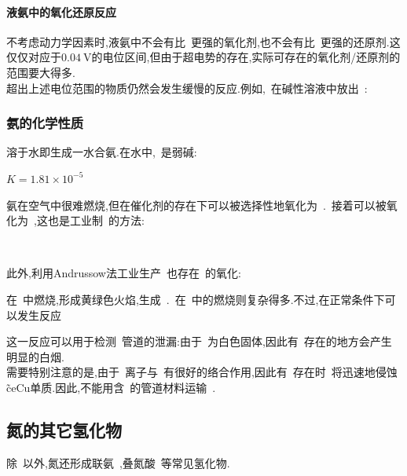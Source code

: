 \documentclass{ctexbook}
\begin{document}
\paragraph{液氨中的氧化还原反应}
不考虑动力学因素时,液氨中不会有比~更强的氧化剂,也不会有比~更强的还原剂.这仅仅对应于$\SI{0.04}{\volt}$的电位区间,但由于超电势的存在,实际可存在的氧化剂/还原剂的范围要大得多.\\
\indent 超出上述电位范围的物质仍然会发生缓慢的反应.例如,~在碱性溶液中放出~:
\begin{tightcenter}
\end{tightcenter}
\subsubsection{氨的化学性质}
溶于水即生成一水合氨.在水中,~是弱碱:
\begin{tightcenter}
    \quad$K=1.81\times10^{-5}$
\end{tightcenter}
\indent 氨在空气中很难燃烧,但在催化剂的存在下可以被选择性地氧化为~.~接着可以被氧化为~,这也是工业制~的方法:
\begin{tightcenter}
    \\
\end{tightcenter}
此外,利用Andrussow法工业生产~也存在~的氧化:
\begin{tightcenter}
\end{tightcenter}
\indent {}在~中燃烧,形成黄绿色火焰,生成~.~在~中的燃烧则复杂得多.不过,在正常条件下可以发生反应
\begin{tightcenter}
\end{tightcenter}
这一反应可以用于检测~管道的泄漏:由于~为白色固体,因此有~存在的地方会产生明显的白烟.\\
\indent 需要特别注意的是,由于~离子与~有很好的络合作用,因此有~存在时~将迅速地侵蚀\~ce{Cu}单质.因此,不能用含~的管道材料运输~.
\subsection{氮的其它氢化物}
除~以外,氮还形成联氨~,叠氮酸~等常见氢化物.
\end{document}
